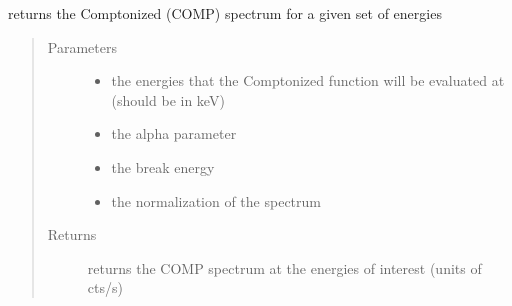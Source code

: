 \documentclass[letterpaper,10pt,english]{sphinxmanual}
\begin{document}
\begin{fulllineitems}
\label{\detokenize{read_process_files:read_process_files.comp}}
returns the Comptonized (COMP) spectrum for a given set of energies
\begin{quote}\begin{description}
\item[{Parameters}] \leavevmode\begin{itemize}
\item {} 
 \textendash{} the energies that the Comptonized function will be evaluated at (should be in keV)

\item {} 
 \textendash{} the alpha parameter

\item {} 
 \textendash{} the break energy

\item {} 
 \textendash{} the normalization of the spectrum

\end{itemize}

\item[{Returns}] \leavevmode
returns the COMP spectrum at the energies of interest (units of cts/s)

\end{description}\end{quote}

\end{fulllineitems}

\end{document}
